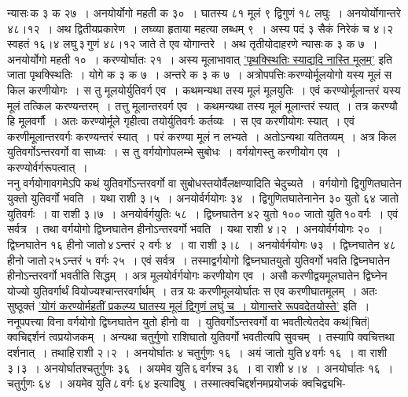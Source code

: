 \documentclass[11pt, openany]{book}
\begin{document}
\newpage

\begin{sloppypar}
\noindent न्यासः\textendash \,क ३ क २७~। अनयोर्योगो महती क ३०~। घातस्य ८१ मूलं ९ द्विगुणं १८ लघुः~। अनयोर्योगान्तरे ४८।१२~। अथ द्वितीयप्रकारेण~। लघ्व्या हृताया महत्या लब्धम् ९~। अस्य पदं ३ सैकं निरेकं च ४।२ स्वहतं १६।४ लघु\textendash \,३\textendash \,गुणं ४८।१२ जाते ते एव योगान्तरे~। अथ तृतीयोदाहरणे न्यासः\textendash \,क ३ क ७~। अनयोर्योगो महती १०~। करण्योर्घातः २१~। अस्य मूलाभावात् \hyperref[4.34]{'पृथक्स्थितिः स्याद्यदि नास्ति मूलम्'} इति जाता पृथक्स्थितिः~। योगे क ३ क ७~। अन्तरे क ३ क ७~। अत्रोपपत्तिः\textendash \,करण्योर्मूलयोगो यस्य मूलं स किल करणीयोगः~। स तु मूलयोर्युतिवर्ग एव~। कथमन्यथा तस्य मूलं मूलयुतिः~। एवं करण्योर्मूलान्तरं यस्य मूलं तत्किल  करण्यन्तरम्~। तत्तु मूलान्तरवर्ग एव~। कथमन्यथा तस्य मूलं मूलान्तरं स्यात्~। तत्र करण्यौ हि मूलवर्गौ~। अतः करण्योर्मूले गृहीत्वा तयोर्युतिवर्गः कर्तव्यः~। स एव करणीयोगः स्यात्~। एवं करणीमूलान्तरवर्गः करण्यन्तरं स्यात्~। परं करण्या मूलं न लभ्यते~। अतोऽन्यथा यतितव्यम्~। अत्र किल युतिवर्गोऽन्तरवर्गो वा साध्यः~। स तु वर्गयोगोपलम्भे सुबोधः~। वर्गयोगस्तु करणीयोग एव~। करण्योर्वर्गरूपत्वात्~।\\ 

ननु वर्गयोगावगमेऽपि कथं युतिवर्गोऽन्तरवर्गो वा सुबोधस्तयोर्वैलक्षण्यादिति चेदुच्यते~। वर्गयोगो द्विगुणितघातेन युक्तो युतिवर्गो भवति~। यथा राशी ३।५~। अनयोर्वर्गयोगः ३४~। द्विगुणितघातेनानेन ३० युतो ६४ जातो युतिवर्गः~। वा राशी ३।७~। अनयोर्वर्गयुतिः ५८~। द्विघ्नघातेन ४२ युतो १०० जातो युति\textendash \,१०\textendash \,वर्गः~। एवं सर्वत्र~। तथा वर्गयोगो द्विघ्नघातेन हीनोऽन्तरवर्गो भवति~। यथा राशी ४।२~। अनयोर्वर्गयोगः २०~। द्विघ्नघातेन १६ हीनो जातो\textendash \,४\textendash \,ऽन्तरं २ वर्गः ४~। वा राशी ३।८~। अनयोर्वर्गयोगः ७३~। द्विघ्नघातेन ४८ हीनो जातो\textendash \,२५\textendash \,ऽन्तरं ५ वर्गः २५~। एवं सर्वत्र~। तस्माद्वर्गयोगो द्विघ्नघातयुतो युतिवर्गो भवति द्विघ्नघातेन हीनोऽन्तरवर्गो भवतीति सिद्धम्~। अत्र मूलयोर्वर्गयोगः करणीयोग एव~। असौ करणीद्वयमूलघातेन द्विघ्नेन योज्यो युतिवर्गार्थं वियोज्यश्चान्तरवर्गार्थम्~। तत्र यः करणीमूलयोर्घातः स एव करणीघातमूलम्~। अतः सुष्ठूक्तं \hyperref[4.34]{'योगं करण्योर्महतीं प्रकल्प्य घातस्य मूलं द्विगुणं लघुं च~। योगान्तरे रूपवदेतयोस्ते'} इति~।\\

ननूपपत्त्या विना वर्गयोगो द्विघ्नघातेन युतो हीनो वा~। युतिवर्गोऽन्तरवर्गो वा भवतीत्येतदेव कथं[चितं] क्वचिद्दर्शनं त्वप्रयोजकम्~। अन्यथा चतुर्गुणो राशिघातो युतिवर्गो भवतीत्यपि सुवचम्~। तस्यापि क्वचित्तथा दर्शनात्~। तथाहि\textendash \,राशी २।२~। अनयोर्घातः ४ चतुर्गुणः १६~। अयं जातो युति\textendash \,४\textendash \,वर्गः १६~। वा राशी ३।३~। अनयोर्घातश्चतुर्गुणः ३६~। अयमेव युति\textendash \,६\textendash \,वर्गश्च ३६~। वा राशी ४।४~। अनयोर्घातः १६~। चतुर्गुणः ६४~। अयमेव युति\textendash \,८\textendash \,वर्गः ६४ इत्यादिषु~। तस्मात्क्वचिद्दर्शनमप्रयोजकं क्वचिद्व्यभि-
\end{sloppypar}
\end{document}
